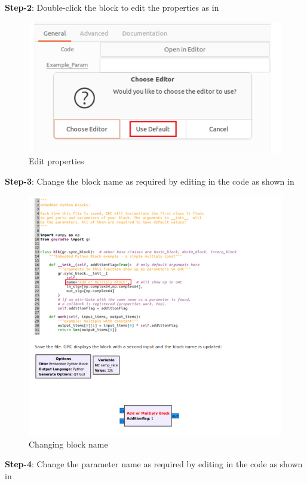 \begin{enumerate}[label=\arabic*.,ref=\thesection.\theenumi]
\textbf{Step-2}:
Double-click the block to edit the properties as in 
\begin{figure}[H]
\centering
\includegraphics[width=0.7\columnwidth]{fm/rx/figs/step_2.png}
\caption{Edit properties}
\label{fig:Edit properties}
\end{figure}
\textbf{Step-3}:
Change the block name as required by editing in the code as shown in                                                
\begin{figure}[H]
\centering
\includegraphics[width=\columnwidth]{fm/rx/figs/step_3.png}
\caption{Changing block name}
\label{fig:changing block name}
\end{figure}
\textbf{Step-4}:
Change the parameter name as required by editing in the code as shown in                                                
\begin{figure}[H]

\end{figure}
\end{enumerate}
